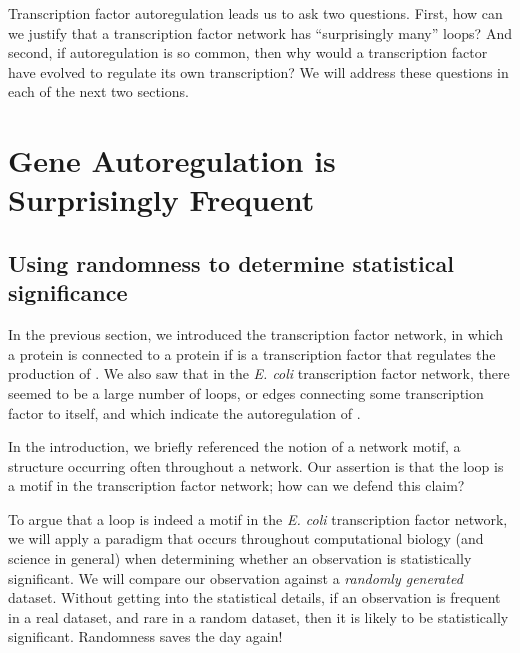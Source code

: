 Transcription factor autoregulation leads us to ask two questions. First, how can we justify that a transcription factor network has ``surprisingly many'' loops? And second, if autoregulation is so common, then why would a transcription factor have evolved to regulate its own transcription? We will address these questions in each of the next two sections.


\FloatBarrier
{}

\section{Gene Autoregulation is Surprisingly Frequent}
\label{sec:gene_autoregulation_is_surprisingly_frequent}

\subsection{Using randomness to determine statistical significance}

In the previous section, we introduced the transcription factor network, in which a protein  is connected to a protein  if  is a transcription factor that regulates the production of . We also saw that in the \textit{E. coli} transcription factor network, there seemed to be a large number of loops, or edges connecting some transcription factor  to itself, and which indicate the autoregulation of .

In the introduction, we briefly referenced the notion of a network motif, a structure occurring often throughout a network. Our assertion is that the loop is a motif in the transcription factor network; how can we defend this claim?

To argue that a loop is indeed a motif in the \textit{E. coli} transcription factor network, we will apply a paradigm that occurs throughout computational biology (and science in general) when determining whether an observation is statistically significant. We will compare our observation against a  \textit{randomly generated} dataset. Without getting into the statistical details, if an observation is frequent in a real dataset, and rare in a random dataset, then it is likely to be statistically significant. Randomness saves the day again!\\

\begin{note}\end{note}

